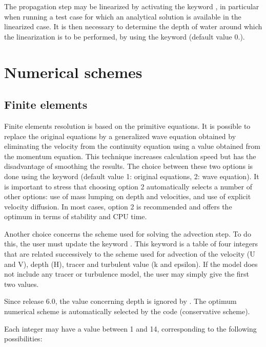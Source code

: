 The propagation step may be linearized by activating the keyword , in particular when running a test case for which an analytical solution is available in the linearized case. It is then necessary to determine the depth of water around which the linearization is to be performed, by using the keyword   (default value 0.).


\section{ Numerical schemes}

\subsection{Finite elements} 
Finite elements resolution is based on the primitive equations. It is possible to replace the original equations by a generalized wave equation obtained by eliminating the velocity from the continuity equation using a value obtained from the momentum equation. This technique increases calculation speed but has the disadvantage of smoothing the results. The choice between these two options is done using the keyword  (default value 1: original equations, 2: wave equation). It is important to stress that choosing option 2 automatically selects a number of other options: use of mass lumping on depth and velocities, and use of explicit velocity diffusion.
 In most cases, option 2 is recommended and offers the optimum in terms of stability and CPU time.

 Another choice concerns the scheme used for solving the advection step. To do this, the user must update the keyword . This keyword is a table of four integers that are related successively to the scheme used for advection of the velocity (U and V), depth (H), tracer and turbulent value (k and epsilon). If the model does not include any tracer or turbulence model, the user may simply give the first two values.

 Since release 6.0, the value concerning depth is ignored by . The optimum numerical scheme is automatically selected by the code (conservative scheme).

 Each integer may have a value between 1 and 14, corresponding to the following possibilities:

